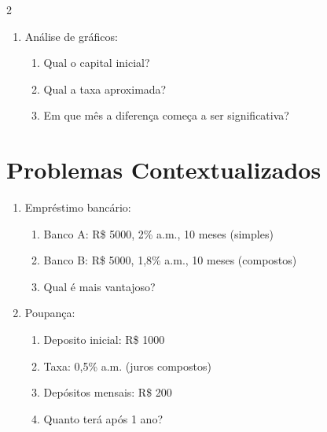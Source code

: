 \documentclass[11pt]{article}
\begin{document}
\begin{multicols}{2}
\begin{enumerate}[leftmargin=*, start=6]
\item Análise de gráficos:
\begin{center}
\end{center}
\begin{enumerate}[label=\alph*)]
\item Qual o capital inicial?
\item Qual a taxa aproximada?
\item Em que mês a diferença começa a ser significativa?
\end{enumerate}

\end{enumerate}

\section*{Problemas Contextualizados}

\begin{enumerate}[leftmargin=*, start=11]

\item Empréstimo bancário:
\begin{enumerate}[label=\alph*)]
\item Banco A: R\$ 5000, 2\% a.m., 10 meses (simples)
\item Banco B: R\$ 5000, 1,8\% a.m., 10 meses (compostos)
\item Qual é mais vantajoso?
\end{enumerate}

\item Poupança:
\begin{enumerate}[label=\alph*)]
\item Deposito inicial: R\$ 1000
\item Taxa: 0,5\% a.m. (juros compostos)
\item Depósitos mensais: R\$ 200
\item Quanto terá após 1 ano?
\end{enumerate}


\end{enumerate}
\end{multicols}
\end{document}
